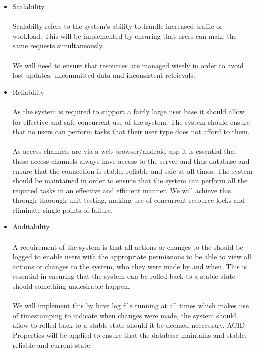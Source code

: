\documentclass[a4paper]{article}
\begin{document}
\begin{itemize}
\begin{itemize}
		\item Scalability \\\\
		    Scalabilty refers to the system's ability to handle increased traffic or workload. This will be implemented by ensuring that users can make the same requests simultaneously.
		    \\\\
		    We will need to ensure that resources are managed wisely in order to avoid lost updates, uncommitted data and inconsistent retrievals.
	
		\item Reliability \\\\
		    As the system is required to support a fairly large user base it should allow for effective and safe concurrent use of the system. The system should ensure that no users can perform tasks that their user type does not afford to them.
		    \\\\
		    As access channels are via a web browser/android app it is essential that these access channels always have access to the server and thus database and ensure that the connection is stable, reliable and safe at all times. The system should be maintained in order  to ensure that the system can perform all the required tasks in an effective and efficient manner. We will achieve this through thorough unit testing, making use of concurrent resource locks and eliminate single points of failure.
		\item Auditability\\\\
		    A requirement of the system is that all actions or changes to the should be logged to enable users with the appropriate permissions to be able to view all actions or changes to the system, who they were made by and when. This is essential in ensuring that the system can be rolled back to a stable state should something undesirable happen.
		    \\\\
		    We will implement this by have log file running at all times which makes use of timestamping to indicate when changes were made, the system should allow to rolled back to a stable state should it be deemed neccessary. ACID Properties will be applied to ensure that the database maintains and stable, reliable and current state.
		    

\end{itemize}
\end{itemize}
\end{document}
